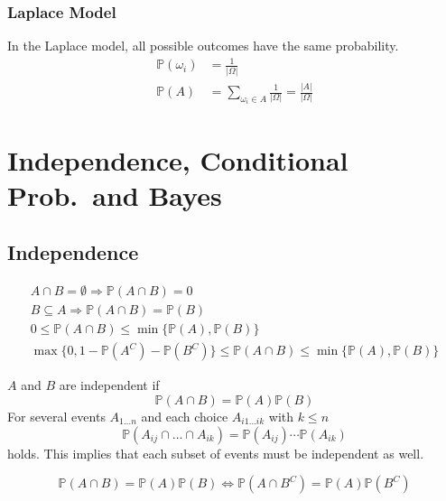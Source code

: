 \subsubsection{Laplace Model}
In the Laplace model, all possible outcomes have the same probability.
\noindent\begin{align*}
    \mathbb{P}(\omega_i) & = \frac{1}{|\Omega|}                                             \\
    \mathbb{P}(A)        & = \sum_{\omega_i \in A}\frac{1}{|\Omega|} = \frac{|A|}{|\Omega|}
\end{align*}

\section{Independence, Conditional Prob.\ and Bayes}
\subsection{Independence}

\noindent\begin{gather*}
    A \cap B = \emptyset \Rightarrow \mathbb{P}(A\cap B) = 0 \\
    B \subseteq A \Rightarrow \mathbb{P}(A\cap B) = \mathbb{P}(B) \\
    0 \leq \mathbb{P}(A\cap B) \leq \min\{\mathbb{P}(A), \mathbb{P}(B)\} \\
    \max\{0, 1-\mathbb{P}(A^C) -\mathbb{P}(B^C)\} \leq \mathbb{P}(A\cap B) \leq \min\{ \mathbb{P}(A), \mathbb{P}(B)\}
\end{gather*}


$A$ and $B$ are independent if
\noindent\begin{equation*}
    \mathbb{P}(A\cap B) = \mathbb{P}(A)\mathbb{P}(B)
\end{equation*}
For several events $A_{1\dots n}$ and each choice $A_{i1\dots ik}$ with $k\leq n$
\noindent\begin{equation*}
    \mathbb{P}(A_{ij} \cap \dots \cap A_{ik}) = \mathbb{P}(A_{ij}) \cdots \mathbb{P}(A_{ik})
\end{equation*}
holds. This implies that each subset of events must be independent as well.


\noindent\begin{equation*}
    \mathbb{P}(A\cap B) = \mathbb{P}(A)\mathbb{P}(B) \Leftrightarrow \mathbb{P}(A\cap B^C) = \mathbb{P}(A)\mathbb{P}(B^C)
\end{equation*}


